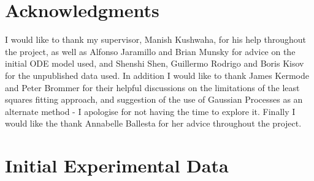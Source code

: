 \documentclass[10pt,journal]{./IEEE_latex_class/IEEEtran}
\begin{document}
\section*{Acknowledgments}
I would like to thank my supervisor, Manish Kushwaha, for his help throughout the project, as well as Alfonso Jaramillo and Brian Munsky for advice on the initial ODE model used, and Shenshi Shen, Guillermo Rodrigo and Boris Kisov for the unpublished data used. In addition I would like to thank James Kermode and Peter Brommer for their helpful discussions on the limitations of the least squares fitting approach, and suggestion of the use of Gaussian Processes as an alternate method - I apologise for not having the time to explore it. Finally I would like the thank Annabelle Ballesta for her advice throughout the project.
\begin{footnotesize}


\end{footnotesize}
\clearpage
\onecolumn

\appendices
\renewcommand\thefigure{\thesection.\arabic{figure}}  


\section{Initial Experimental Data}
\label{Initial Experimental Data}
\setcounter{figure}{0}    
\end{document}
